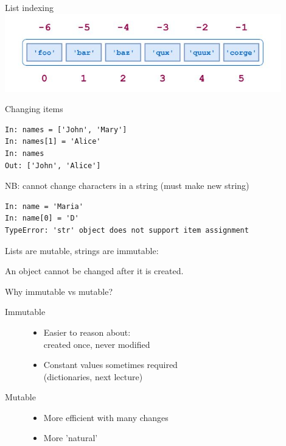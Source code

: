 \documentclass[aspectratio=169,usenames,dvipsnames]{beamer}
\begin{document}
\begin{frame}[fragile]{List indexing}
\includegraphics[width=0.9\textwidth]{fig/list}
\end{frame}

\begin{frame}[fragile]{Changing items}
\begin{lstlisting} 
In: names = ['John', 'Mary']
In: names[1] = 'Alice'
In: names
Out: ['John', 'Alice']
\end{lstlisting} 

\pause
NB: cannot change characters in a string (must make new string)
\begin{lstlisting} 
In: name = 'Maria'
In: name[0] = 'D'
TypeError: 'str' object does not support item assignment
\end{lstlisting}

Lists are mutable, strings are immutable:
\begin{definition}
An  object cannot be changed after it is created.
\end{definition}
\end{frame}

\begin{frame}{Why immutable vs mutable?}
    \begin{description}
        \item[Immutable]
            \begin{itemize}
                \item Easier to reason about:\\
                    created once, never modified
                \item Constant values sometimes required\\
                    (dictionaries, next lecture)
            \end{itemize}

        \item[Mutable]
            \begin{itemize}
                \item More efficient with many changes
                \item More 'natural'
            \end{itemize}
    \end{description}
\end{frame}
\end{document}
